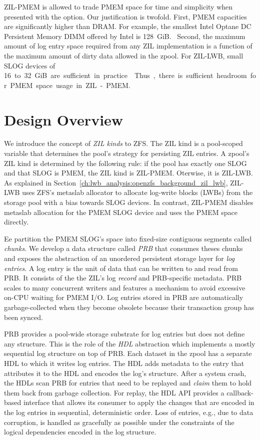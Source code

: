 \documentclass[12pt,a4paper,twoside]{book}
\begin{document}
ZIL-PMEM is allowed to trade PMEM space for time and simplicity when presented with the option.
Our justification is twofold.
First, PMEM capacities are significantly higher than DRAM.
For example, the smallest Intel Optane DC Persistent Memory DIMM offered by Intel is \SI{128}{GiB}.~\cite{optanepricing_missing}
Second, the maximum amount of log entry space required from any ZIL implementation is a function of the maximum amount of dirty data allowed in the zpool.
For ZIL-LWB, small SLOG devices of \SI{16} to \SI{32}{GiB} are sufficient in practice.
Thus, there is sufficient headroom for PMEM space usage in ZIL-PMEM.

\section{Design Overview}\label{sec:designoverview}
We introduce the concept of \textit{ZIL kinds} to ZFS.
The ZIL kind is a pool-scoped variable that determines the pool's strategy for persisting ZIL entries.
A zpool's ZIL kind is determined by the following rule:
if the pool has exactly one SLOG and that SLOG is PMEM, the ZIL kind is ZIL-PMEM. Oterwise, it is ZIL-LWB.
As explained in Section~\ref{ch:lwb_analysis:openzfs_background_zil_lwb}, ZIL-LWB uses ZFS's metaslab allocator to allocate log-write blocks (LWBs) from the storage pool with a bias towards SLOG devices.
In contrast, ZIL-PMEM disables metaslab allocation for the PMEM SLOG device and uses the PMEM space directly.

Ee partition the PMEM SLOG's space into fixed-size contiguous segments called \textit{chunks}.
We develop a data structure called \textit{PRB} that consumes theses chunks and exposes the abstraction of an unordered persistent storage layer for \textit{log entries}.
A log entry is the unit of data that can be written to and read from PRB.
It consists of the the ZIL's log \textit{record} and PRB-specific metadata.
PRB scales to many concurrent writers and features a mechanism to avoid excessive on-CPU waiting for PMEM I/O.
Log entries stored in PRB are automatically garbage-collected when they become obsolete because their transaction group has been synced.

PRB provides a pool-wide storage substrate for log entries but does not define any structure.
This is the role of the \textit{HDL} abstraction which implements a mostly sequential log structure on top of PRB.
Each dataset in the zpool has a separate HDL to which it writes log entries.
The HDL adds metadata to the entry that attributes it to the HDL and encodes the log's structure.
After a system crash, the HDLs scan PRB for entries that need to be replayed and \textit{claim} them to hold them back from garbage collection.
For replay, the HDL API provides a callback-based interface that allows its consumer to apply the changes that are encoded in the log entries in sequential, deterministic order.
Loss of entries, e.g., due to data corruption, is handled as gracefully as possible under the constraints of the logical dependencies encoded in the log structure.
\end{document}
